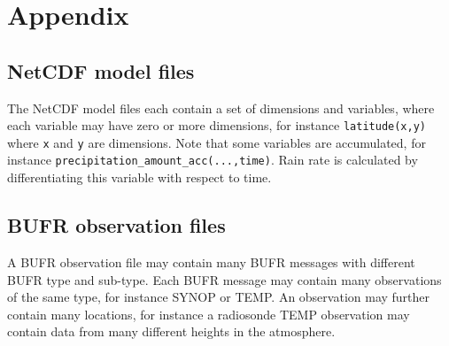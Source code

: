 \documentclass[letterpaper,10pt,twoside,twocolumn,openany]{book}
\begin{document}
{%

\newpage
\hypertarget{appendix}{}
\section{Appendix}
\hypertarget{netcdf}{}
\subsection{NetCDF model files}
The NetCDF model files each contain a set of dimensions and variables, 
where each variable may have zero or more dimensions, for instance \lstinline!latitude(x,y)! where
\lstinline!x! and \lstinline!y! are dimensions. 
Note that some variables are accumulated, for instance \lstinline!precipitation_amount_acc(...,time)!. 
Rain rate is calculated by differentiating this variable with respect to time.

\hypertarget{bufr}{}
\subsection{BUFR observation files}
A BUFR observation file may contain many BUFR messages with different BUFR type and sub-type.
Each BUFR message may contain many observations of the same type, for instance SYNOP or TEMP. 
An observation may further contain many locations, for instance a radiosonde TEMP 
observation may contain data from many different heights in the atmosphere.


\hypertarget{sequence}{}
}
\end{document}
